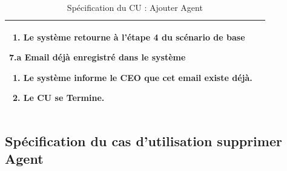 \begin{table}[H]
\begin{tabularx}{\textwidth}{|l|X|}
\begin{enumerate}[leftmargin=1.5em, topsep=2pt, itemsep=1pt]
  \item Le système retourne à l'étape 4 du scénario de base
\end{enumerate}
\textbf{7.a Email déjà enregistré dans le système}
\begin{enumerate}[leftmargin=1.5em, topsep=2pt, itemsep=1pt]
  \item Le système informe le CEO que cet email existe déjà.
  \item Le CU se Termine.
\end{enumerate} \\
\hline
\end{tabularx}
\caption{Spécification du CU : Ajouter Agent}
\label{tab:cu-ajouter-agent}
\end{table}

\newpage
\subsection{Spécification du cas d'utilisation supprimer Agent}

